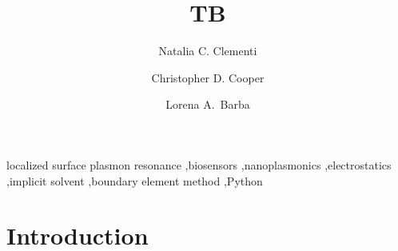 \documentclass[final,5p,times,twocolumn]{elsarticle}
\begin{document}
\begin{frontmatter}



\title{TB}

\author[gwu]{Natalia C. Clementi}

\author[usm]{Christopher D. Cooper}

\author[gwu]{Lorena A.~Barba}


\address[usm]{Department of Mechanical Engineering, Universidad T\'ecnica Federico Santa Mar\'ia, Valpara\'iso, Chile.}
\address[gwu]{Department of Mechanical \& Aerospace Engineering, The George Washington University, Washington, D.C.}


\begin{abstract}

\end{abstract}

\begin{keyword}
localized surface plasmon resonance \sep biosensors \sep nanoplasmonics \sep electrostatics  \sep implicit solvent \sep boundary element method  \sep Python 


\end{keyword}

\end{frontmatter}


\section{Introduction}\label{sec:intro}

\end{document}
